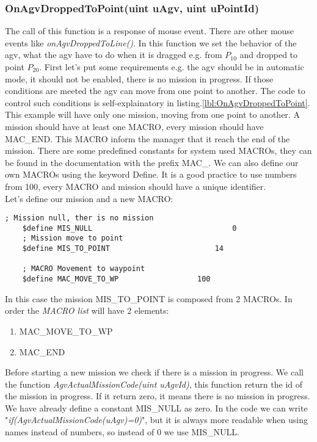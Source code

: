 \subsubsection{OnAgvDroppedToPoint(uint uAgv, uint uPointId) }
The call of this function is a response of mouse event. There are other mouse events like \textit{onAgvDroppedToLine()}.
In this function we set the behavior of the agv, what the agv have to do when it is dragged e.g. from $P_{10}$ and dropped to point $P_{20}$.
First let's put some requirements e.g. the agv should be in automatic mode, it should not be enabled, there is no mission in progress.
If those conditions are meeted the agv can move from one point to another. The code to control such conditions is self-explainatory in listing.\ref{lbl:OnAgvDroppedToPoint}.\\

This example will have only one mission, moving from one point to another. A mission should have at least one MACRO, every mission should have MAC\_END. This MACRO inform the manager that it reach the end of the mission.
There are some predefined constants for system used MACROs, they can be found in the documentation with the prefix MAC\_.
We can also define our own MACROs using the keyword Define. It is a good practice to use numbers from 100, every MACRO and mission should have a unique identifier.\\

Let's define our mission and a new MACRO:
\begin{lstlisting}[frame=single]
	; Mission null, ther is no mission
	$define MIS_NULL								0
	; Mission move to point
	$define MIS_TO_POINT						14
	
	; MACRO Movement to waypoint
	$define MAC_MOVE_TO_WP					100
\end{lstlisting}

In this case the mission MIS\_TO\_POINT is composed from 2 MACROs. In order the \textit{MACRO list} will have 2 elements:
\begin{enumerate}
	\item MAC\_MOVE\_TO\_WP
	\item MAC\_END \\
\end{enumerate}

Before starting a new mission we check if there is a mission in progress.
We call the function \textit{AgvActualMissionCode(uint uAgvId)}, this function return the id of the mission in progress.
If it return zero, it means there is no mission in progress. We have already define a constant MIS\_NULL as zero.
In the code we can write "\textit{if(AgvActualMissionCode(uAgv)=0)}", but it is always more readable when using names instead of numbers, so instead of 0 we use MIS\_NULL.\\

